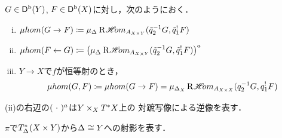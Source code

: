 \begin{DFN}
  \(G\in\Dompb(Y)\), \(F\in\Dompb(X)\)に対し，次のようにおく．
  \begin{enumerate}[(i)]
    \item \(\muhom(G\to F)\coloneqq\mu_{\diag[]}\RHOM_{A_{X\times Y}}(\tilde{q}_2^{-1}G,\tilde{q}_1^{!}F)\)
    \item \(\muhom(F\leftarrow G)\coloneqq\left(\mu_{\diag[]}\RHOM_{A_{X\times Y}}(\tilde{q}_2^{-1}G,\tilde{q}_1^{!}F)\right)^{a}\)
    \item \(Y\to X\)で\(f\)が恒等射のとき，\[
      \muhom(G,F)
      \coloneqq\muhom(G\to F)
      =\mu_{\diag[X]}\RHOM_{A_{X\times X}}({q}_2^{-1}G,{q}_1^{!}F)
    \]
  \end{enumerate}
\end{DFN}
(ii)の右辺の\((\blk)^{a}\)は\(Y\tpb[X]\cotb[X]\)上の
対蹠写像による逆像を表す．

\(\pi\)で\(T^{\ast}_{\diag[]}(X\times Y)\)から\(\diag[]\cong Y\)への射影を表す．

